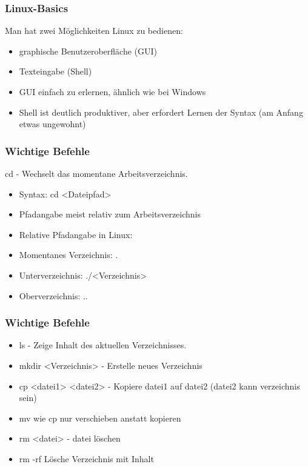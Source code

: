 \begin{frame}[fragile]
\frametitle{Linux-Basics}
Man hat zwei Möglichkeiten Linux zu bedienen:
\begin{itemize}
\item graphische Benutzeroberfläche (GUI)
\item Texteingabe (Shell)
\item GUI einfach zu erlernen, ähnlich wie bei Windows
\item Shell ist deutlich produktiver, aber erfordert Lernen der Syntax (am Anfang etwas ungewohnt)
\end{itemize}
\end{frame}


\begin{frame}[fragile]
\frametitle{Wichtige Befehle}
cd - Wechselt das momentane Arbeitsverzeichnis.
\begin{itemize}
\item Syntax: cd <Dateipfad>
\item Pfadangabe meist relativ zum Arbeitsverzeichnis
\item Relative Pfadangabe in Linux:
\item Momentanes Verzeichnis: .
\item Unterverzeichnis: ./<Verzeichnis>
\item Oberverzeichnis: ..
\end{itemize}
\end{frame}


\begin{frame}[fragile]
\frametitle{Wichtige Befehle}
\begin{itemize}
\item ls - Zeige Inhalt des aktuellen Verzeichnisses.
\item mkdir <Verzeichnis> - Erstelle neues Verzeichnis
\item cp <datei1> <datei2> - Kopiere datei1 auf datei2 (datei2 kann verzeichnis sein)
\item mv wie cp nur verschieben anstatt kopieren
\item rm <datei> - datei löschen
\item rm -rf Lösche Verzeichnis mit Inhalt
\end{itemize}
\end{frame}


